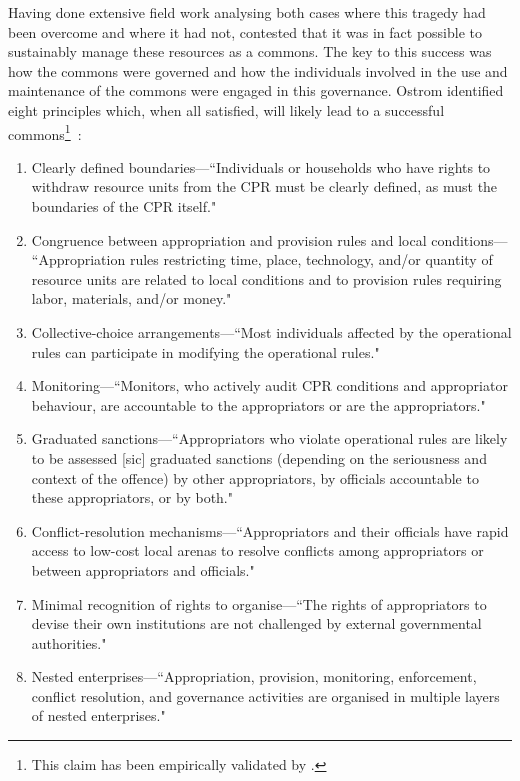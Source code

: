 Having done extensive field work analysing both cases where this tragedy had been overcome and where it had not, \citet{Ostrom1990} contested that it was in fact possible to sustainably manage these resources as a commons.
The key to this success was  how the commons were governed and how the individuals involved in the use and maintenance of the commons were engaged in this governance. 
Ostrom identified eight principles which, when all satisfied, will likely lead to a successful commons\footnote{This claim has been empirically validated by \citet{cox2010review}.}~\cite[pp.\ 91-101]{Ostrom1990}:
\begin{enumerate}
\item Clearly defined boundaries---``Individuals or households who have rights to withdraw resource units from the \ac{CPR} must be clearly defined, as must the boundaries of the \ac{CPR} itself."
\item Congruence between appropriation and provision rules and local conditions--- ``Appropriation rules restricting time, place, technology, and/or quantity of resource units are related to local conditions and to provision rules requiring labor, materials, and/or money."
\item Collective-choice arrangements---``Most individuals affected by the operational rules can participate in modifying the operational rules."
\item Monitoring---``Monitors, who actively audit \ac{CPR} conditions and appropriator behaviour, are accountable to the appropriators or are the appropriators."
\item Graduated sanctions---``Appropriators who violate operational rules are likely to be assessed [sic] graduated sanctions (depending on the seriousness and context of the offence) by other appropriators, by officials accountable to these appropriators, or by both."
\item Conflict-resolution mechanisms---``Appropriators and their officials have rapid access to low-cost local arenas to resolve conflicts among appropriators or between appropriators and officials."
\item Minimal recognition of rights to organise---``The rights of appropriators to devise their own institutions are not challenged by external governmental authorities."
\item Nested enterprises---``Appropriation, provision, monitoring, enforcement, conflict resolution, and governance activities are organised in multiple layers of nested enterprises."
\end{enumerate}

